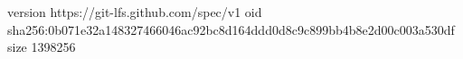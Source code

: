 version https://git-lfs.github.com/spec/v1
oid sha256:0b071e32a148327466046ac92bc8d164ddd0d8c9c899bb4b8e2d00c003a530df
size 1398256
